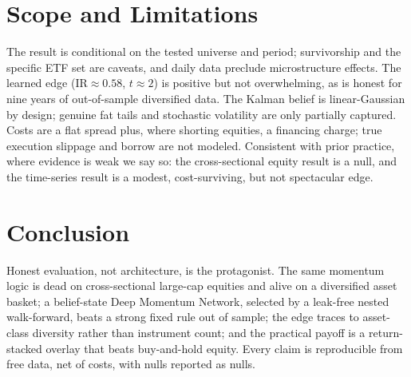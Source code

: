 \documentclass[11pt,a4paper]{article}
\theoremstyle{definition}
\newcommand{\IR}{\mathrm{IR}}
\begin{document}
\section{Scope and Limitations}
\label{sec:scope}

The result is conditional on the tested universe and period; survivorship and the specific ETF set
are caveats, and daily data preclude microstructure effects. The learned edge ($\IR\approx 0.58$,
$t\approx 2$) is positive but not overwhelming, as is honest for nine years of out-of-sample
diversified data. The Kalman belief is linear-Gaussian by design; genuine fat tails and stochastic
volatility are only partially captured. Costs are a flat spread plus, where shorting equities,
a financing charge; true execution slippage and borrow are not modeled. Consistent with prior
practice, where evidence is weak we say so: the cross-sectional equity result is a null, and the
time-series result is a modest, cost-surviving, but not spectacular edge.

\section{Conclusion}
\label{sec:concl}

Honest evaluation, not architecture, is the protagonist. The same momentum logic is dead on
cross-sectional large-cap equities and alive on a diversified asset basket; a belief-state Deep
Momentum Network, selected by a leak-free nested walk-forward, beats a strong fixed rule out of
sample; the edge traces to asset-class diversity rather than instrument count; and the practical
payoff is a return-stacked overlay that beats buy-and-hold equity. Every claim is reproducible from
free data, net of costs, with nulls reported as nulls.
\end{document}
